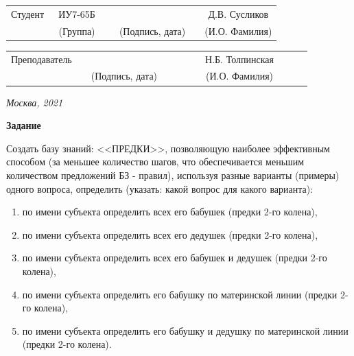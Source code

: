 \documentclass[12pt, a4paper]{extarticle}
\begin{document}
\noindent
{}
\\

\noindent
{}
\\

\vspace{1.5cm}
\noindent
\begin{tabular}{l c c c c c}
	Студент      & ~ИУ7-65Б~               & \hspace{2.5cm} & \hspace{2cm}                 & &  Д.В. Сусликов \\\cline{2-2}\cline{4-4} \cline{6-6} 
	\hspace{3cm} & {\footnotesize(Группа)} &                & {\footnotesize(Подпись, дата)} & & {\footnotesize(И.О. Фамилия)}
\end{tabular}

\noindent
\begin{tabular}{l c c c c}
	Преподаватель & \hspace{5cm}   & \hspace{2cm}                 & & ~~~~~~Н.Б. Толпинская~~~~~~\\\cline{3-3} \cline{5-5} 
	\hspace{3cm}  &                & {\footnotesize(Подпись, дата)} & & {\footnotesize(И.О. Фамилия)}
\end{tabular}

\vspace{0.6cm}
\begin{center}	
	\vfill
	\large \textit {Москва, 2021}
\end{center}

\thispagestyle {empty}
\pagebreak

\clearpage

\textbf{Задание}\par

Создать базу знаний: <<ПРЕДКИ>>, позволяющую наиболее эффективным способом (за меньшее количество шагов, что обеспечивается меньшим количеством предложений БЗ - правил), используя разные варианты (примеры) одного вопроса, определить (указать: какой вопрос для какого варианта):
\begin{enumerate}
	\item по имени субъекта определить всех его бабушек (предки 2-го колена),
	\item по имени субъекта определить всех его дедушек (предки 2-го колена),
	\item по имени субъекта определить всех его бабушек и дедушек (предки 2-го колена),
	\item по имени субъекта определить его бабушку по материнской линии (предки 2-го колена),
	\item по имени субъекта определить его бабушку и дедушку по материнской линии (предки 2-го колена).
\end{enumerate}
\end{document}
